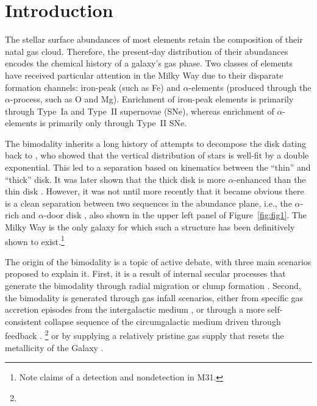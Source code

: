 \documentclass[twocolumn,linenumbers]{aastex631}
\begin{document}
\section{Introduction}\label{sec:intro}
The stellar surface abundances of most elements retain the composition of their natal gas cloud. Therefore, the present-day distribution of their abundances encodes the chemical history of a galaxy's gas phase. Two classes of elements have received particular attention in the Milky Way due to their disparate formation channels: iron-peak (such as Fe) and $\alpha$-elements (produced through the $\alpha$-process, such as O and Mg). Enrichment of iron-peak elements is primarily through Type~Ia and Type~II supernovae (SNe), whereas enrichment of $\alpha$-elements is primarily only through Type~II SNe.

The bimodality inherits a long history of attempts to decompose the disk dating back to \citet{1983MNRAS.202.1025G}, who showed that the vertical distribution of stars is well-fit by a double exponential. This led to a separation based on kinematics between the ``thin'' and ``thick'' disk. It was later shown that the thick disk is more $\alpha$-enhanced than the thin disk \citep{1996ASPC...92..307G,1998A&A...338..161F,2004AN....325....3F,2006MNRAS.367.1329R}. However, it was not until more recently that it became obvious there is a clean separation between two sequences in the abundance plane, i.e., the $\alpha$-rich and $\alpha$-door disk \citep{2011A&A...535L..11A,2012A&A...545A..32A,2014A&A...562A..71B,2014ApJ...796...38N,2020MNRAS.493.2952H}, also shown in the upper left panel of Figure~\ref{fig:fig1}. The Milky Way is the only galaxy for which such a structure has been definitively shown to exist.\footnote{Note claims of a detection \citep{2023ApJ...956L..14K} and nondetection \citep{2024IAUS..377..115N} in M31.}

The origin of the bimodality is a topic of active debate, with three main scenarios proposed to explain it. First, it is a result of internal secular processes that generate the bimodality through radial migration \citep{2009MNRAS.396..203S,2021MNRAS.507.5882S,2023MNRAS.523.3791C} or clump formation \citep{2019MNRAS.484.3476C,2020MNRAS.492.4716B,2021MNRAS.502..260B,2023ApJ...953..128G}. Second, the bimodality is generated through gas infall scenarios, either from specific gas accretion episodes from the intergalactic medium \citep{1997ApJ...477..765C,2009IAUS..254..191C,2017MNRAS.472.3637G,2019A&A...623A..60S}, or through a more self-consistent collapse sequence of the circumgalactic medium driven through feedback \citep{2021MNRAS.501.5176K}. \footnote{} or by supplying a relatively pristine gas supply that resets the metallicity of the Galaxy \citep{2020MNRAS.491.5435B,2024MNRAS.528L.122C}.
\end{document}
